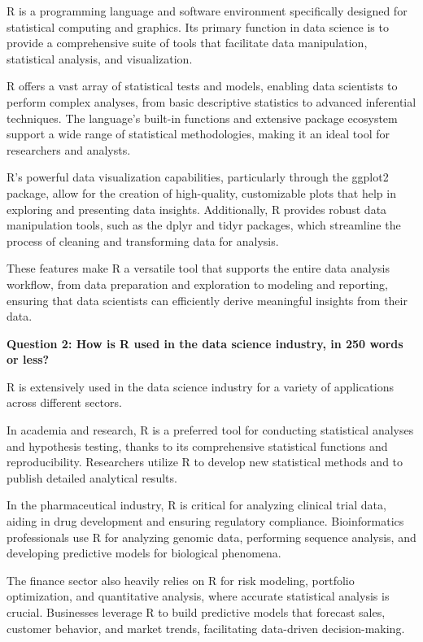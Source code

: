 \documentclass[a4paper, 11pt]{report}
\begin{document}
R is a programming language and software environment specifically designed for statistical computing and graphics. Its primary function in data science is to provide a comprehensive suite of tools that facilitate data manipulation, statistical analysis, and visualization.

R offers a vast array of statistical tests and models, enabling data scientists to perform complex analyses, from basic descriptive statistics to advanced inferential techniques. The language's built-in functions and extensive package ecosystem support a wide range of statistical methodologies, making it an ideal tool for researchers and analysts.

R's powerful data visualization capabilities, particularly through the ggplot2 package, allow for the creation of high-quality, customizable plots that help in exploring and presenting data insights. Additionally, R provides robust data manipulation tools, such as the dplyr and tidyr packages, which streamline the process of cleaning and transforming data for analysis.

These features make R a versatile tool that supports the entire data analysis workflow, from data preparation and exploration to modeling and reporting, ensuring that data scientists can efficiently derive meaningful insights from their data.

\vspace{\baselineskip}

\textbf{Question 2: How is R used in the data science industry, in 250 words or less?}

R is extensively used in the data science industry for a variety of applications across different sectors.

In academia and research, R is a preferred tool for conducting statistical analyses and hypothesis testing, thanks to its comprehensive statistical functions and reproducibility. Researchers utilize R to develop new statistical methods and to publish detailed analytical results.

In the pharmaceutical industry, R is critical for analyzing clinical trial data, aiding in drug development and ensuring regulatory compliance. Bioinformatics professionals use R for analyzing genomic data, performing sequence analysis, and developing predictive models for biological phenomena.

The finance sector also heavily relies on R for risk modeling, portfolio optimization, and quantitative analysis, where accurate statistical analysis is crucial. Businesses leverage R to build predictive models that forecast sales, customer behavior, and market trends, facilitating data-driven decision-making.
\end{document}
